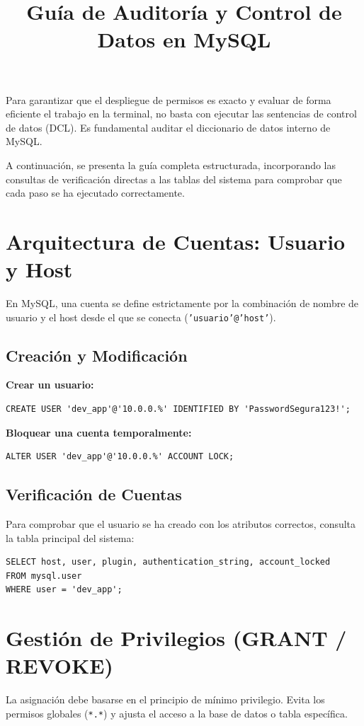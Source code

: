 \documentclass[12pt,a4paper]{article}
\title{\textbf{Guía de Auditoría y Control de Datos en MySQL}}
\author{}
\date{}
\begin{document}
\maketitle

Para garantizar que el despliegue de permisos es exacto y evaluar de forma eficiente el trabajo en la terminal, no basta con ejecutar las sentencias de control de datos (DCL). Es fundamental auditar el diccionario de datos interno de MySQL.

A continuación, se presenta la guía completa estructurada, incorporando las consultas de verificación directas a las tablas del sistema para comprobar que cada paso se ha ejecutado correctamente.

\section{Arquitectura de Cuentas: Usuario y Host}
En MySQL, una cuenta se define estrictamente por la combinación de nombre de usuario y el host desde el que se conecta (\texttt{'usuario'@'host'}).

\subsection{Creación y Modificación}
\textbf{Crear un usuario:}
\begin{lstlisting}
CREATE USER 'dev_app'@'10.0.0.%' IDENTIFIED BY 'PasswordSegura123!';
\end{lstlisting}

\textbf{Bloquear una cuenta temporalmente:}
\begin{lstlisting}
ALTER USER 'dev_app'@'10.0.0.%' ACCOUNT LOCK;
\end{lstlisting}

\subsection*{ Verificación de Cuentas}
Para comprobar que el usuario se ha creado con los atributos correctos, consulta la tabla principal del sistema:
\begin{lstlisting}
SELECT host, user, plugin, authentication_string, account_locked 
FROM mysql.user 
WHERE user = 'dev_app';
\end{lstlisting}

\section{Gestión de Privilegios (GRANT / REVOKE)}
La asignación debe basarse en el principio de mínimo privilegio. Evita los permisos globales (\texttt{*.*}) y ajusta el acceso a la base de datos o tabla específica.
\end{document}
